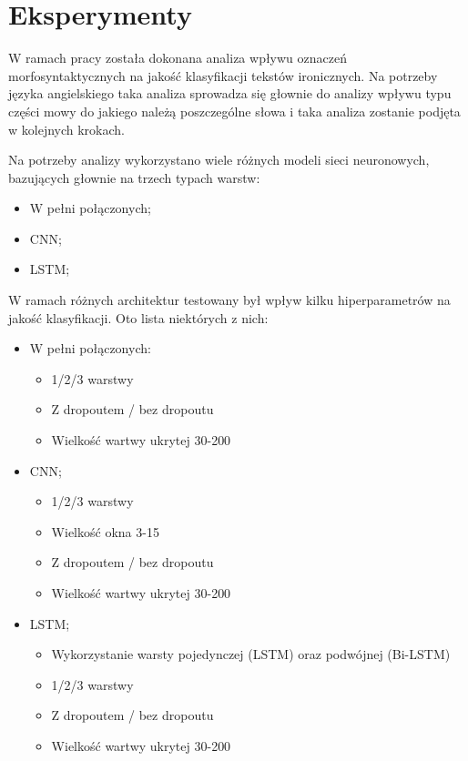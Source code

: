 \newpage %
\section{Eksperymenty}
   
W ramach pracy została dokonana analiza wpływu oznaczeń morfosyntaktycznych na jakość klasyfikacji tekstów ironicznych. Na potrzeby języka angielskiego taka analiza sprowadza się głownie do analizy wpływu typu części mowy do jakiego należą poszczególne słowa i taka analiza zostanie podjęta w kolejnych krokach. 


Na potrzeby analizy wykorzystano wiele różnych modeli sieci neuronowych, bazujących głownie na trzech typach warstw: 

\begin{itemize}
    \item W pełni połączonych;
    \item CNN;
    \item LSTM;
\end{itemize}

W ramach różnych architektur testowany był wpływ kilku hiperparametrów na jakość klasyfikacji. Oto lista niektórych z nich:
\begin{itemize}
    \item W pełni połączonych:
          \begin{itemize}
              \item  1/2/3 warstwy
              \item Z dropoutem / bez dropoutu
              \item Wielkość wartwy ukrytej 30-200
          \end{itemize}

    \item CNN;
          \begin{itemize}
              \item  1/2/3 warstwy
              \item Wielkość okna 3-15
              \item Z dropoutem / bez dropoutu
              \item Wielkość wartwy ukrytej 30-200
          \end{itemize}
    \item LSTM;
    \begin{itemize}
        \item Wykorzystanie warsty pojedynczej (LSTM) oraz podwójnej (Bi-LSTM)
        \item  1/2/3 warstwy
        \item Z dropoutem / bez dropoutu
        \item Wielkość wartwy ukrytej 30-200
    \end{itemize}
\end{itemize}


